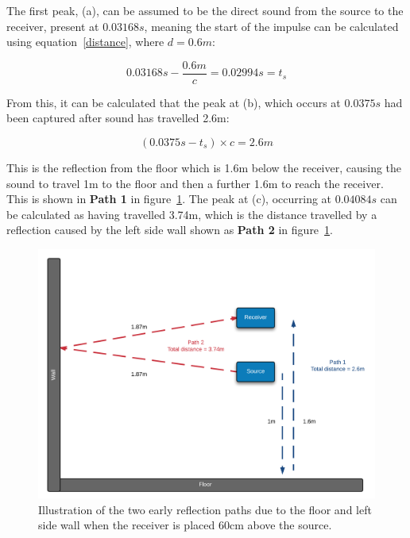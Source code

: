 \documentclass[../../main.tex]{subfiles}
\begin{document}
			The first peak, (a), can be assumed to be the direct sound from the source to the receiver, present at $0.03168s$, meaning the start of the impulse can be calculated using equation~\ref{distance}, where $d = 0.6m$:

			\begin{equation}
			0.03168s - \frac{0.6m}{c} = 0.02994s = t_s
			\end{equation}

			From this, it can be calculated that the peak at (b), which occurs at $0.0375s$ had been captured after sound has travelled 2.6m:

			\begin{equation}
			(0.0375s - t_s)\times{c} = 2.6m
			\end{equation}

			This is the reflection from the floor which is 1.6m below the receiver, causing the sound to travel 1m to the floor and then a further 1.6m to reach the receiver. This is shown in \textbf{Path 1} in figure~\ref{reflectionPaths}. The peak at (c), occurring at $0.04084s$ can be calculated as having travelled 3.74m, which is the distance travelled by a reflection caused by the left side wall shown as \textbf{Path 2} in figure~\ref{reflectionPaths}.

			\begin{figure}[t]
			\centerline{\includegraphics[width=\textwidth]{Sections/Implementation/Odeon/images/incorrectRIR/reflectionPaths_colourV2.png}}
				\caption{Illustration of the two early reflection paths due to the floor and left side wall when the receiver is placed 60cm above the source.}
				\label{reflectionPaths}
			\end{figure}
\end{document}
